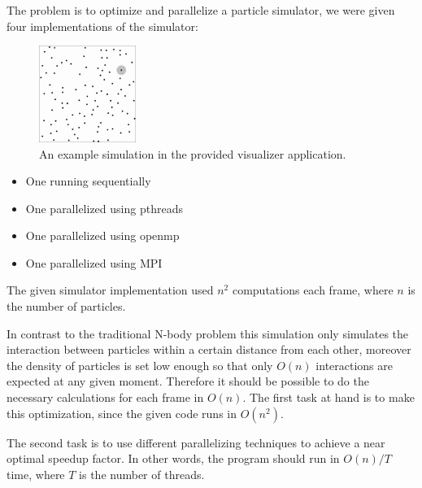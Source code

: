 


The problem is to optimize and parallelize a particle simulator, we
were given four implementations of the simulator:

\begin{figure}
    \vspace{-130pt}
    \begin{center}
        \includegraphics[width=0.28\textwidth]{simulator}
    \end{center}
    \caption{An example simulation in the provided visualizer application.}
\end{figure}

\begin{itemize}
     \item One running sequentially
     \item One parallelized using pthreads
     \item One parallelized using openmp 
     \item One parallelized using MPI
\end{itemize}

The given simulator implementation used $n^2$ computations each frame, where $n$ is the number of particles.

In contrast to the traditional N-body problem this simulation only
simulates the interaction between particles within a certain distance from
each other, moreover the density of particles is set low enough so that
only $O(n)$ interactions are expected at any given moment. Therefore it
should be possible to do the necessary calculations for each frame in
$O(n)$. The first task at hand is to make this optimization, since the given code runs in $O(n^2)$.

The second task is to use different parallelizing techniques to achieve a near optimal speedup factor. In other words, the program should run in $O(n)/T$ time, where $T$ is the number of threads.
